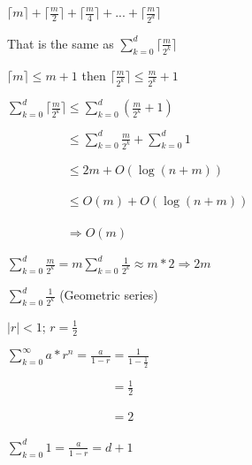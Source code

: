 \documentclass{article}
\begin{document}
$\lceil m \rceil + \lceil \frac{m}{2} \rceil + \lceil \frac{m}{4} \rceil + ... + \lceil \frac{m}{2^d} \rceil$

\bigbreak

That is the same as $\sum_{k=0}^{d} \lceil \frac{m}{2^k} \rceil$

\bigbreak

$\lceil m \rceil \leq m + 1$ then $\lceil \frac{m}{2^k} \rceil \leq \frac{m}{2^k} + 1$

\bigbreak

$\sum_{k=0}^{d} \lceil \frac{m}{2^k} \rceil \leq \sum_{k=0}^{d} (\frac{m}{2^k} + 1)$

\bigbreak


$\phantom{\sum_{k=0}^{d} \lceil \frac{m}{2^k} \rceil} \leq \sum_{k=0}^{d} \frac{m}{2^k} + \sum_{k=0}^{d} 1$

\bigbreak

$\phantom{\sum_{k=0}^{d} \lceil \frac{m}{2^k} \rceil} \leq 2m + O(\log (n+m))$

\bigbreak

$\phantom{\sum_{k=0}^{d} \lceil \frac{m}{2^k} \rceil} \leq O(m) + O(\log (n+m))$

\bigbreak

$\phantom{\sum_{k=0}^{d} \lceil \frac{m}{2^k} \rceil} \Rightarrow \boxed{O(m)}$

\bigbreak

$\sum_{k=0}^{d} \frac{m}{2^k} = m \sum_{k=0}^{d} \frac{1}{2^k} \approx m * 2 \Rightarrow 2m$

\bigbreak

$\sum_{k=0}^{d} \frac{1}{2^k}$ (Geometric series)

\bigbreak

$|r| < 1$; $r = \frac{1}{2}$

\bigbreak

$\sum_{k=0}^{\infty} a * r ^ n = \frac{a}{1-r} = \frac{1}{1-\frac{1}{2}}$

\bigbreak

$\phantom{\sum_{k=0}^{\infty} a * r ^ n = \frac{a}{1-r}} = \frac{1}{2}$

\bigbreak

$\phantom{\sum_{k=0}^{\infty} a * r ^ n = \frac{a}{1-r}} = 2$

\bigbreak

$\sum_{k=0}^{d} 1 = \frac{a}{1-r} = d + 1$
\end{document}
